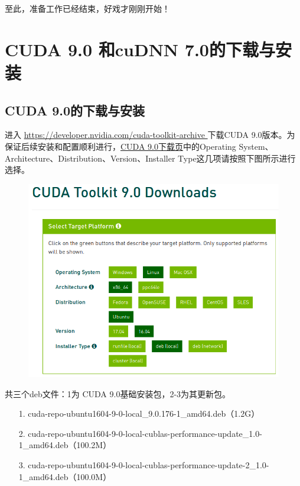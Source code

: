 \documentclass[11pt,a4paper]{ctexart}
\begin{document}
至此，准备工作已经结束，好戏才刚刚开始！

\newpage
\section{ CUDA 9.0 和cuDNN 7.0的下载与安装}
\subsection{ CUDA 9.0的下载与安装}
进入 \url {https://developer.nvidia.com/cuda-toolkit-archive } 下载CUDA  9.0版本。为保证后续安装和配置顺利进行，\href{https://developer.nvidia.com/cuda-90-download-archive?target_os=Linux&target_arch=x86_64&target_distro=Ubuntu&target_version=1604&target_type=deblocal}{CUDA  9.0下载页}中的Operating System、Architecture、Distribution、Version、Installer Type这几项请按照下图所示进行选择。
\begin{figure}[h]
\begin{center}
\includegraphics[width=1.1\textwidth]{CUDA_9_0} 
\end{center}
\end{figure}
\vspace{-0.5cm}

共三个deb文件：1为 CUDA 9.0基础安装包，2-3为其更新包。
\begin{itemize}
\item[1.] cuda-repo-ubuntu1604-9-0-local\_9.0.176-1\_amd64.deb（1.2G）
\item[2.] cuda-repo-ubuntu1604-9-0-local-cublas-performance-update\_1.0-1\_amd64.deb（100.2M）
\item[3.] cuda-repo-ubuntu1604-9-0-local-cublas-performance-update-2\_1.0-1\_amd64.deb（100.0M）
\end{itemize}
\end{document}
